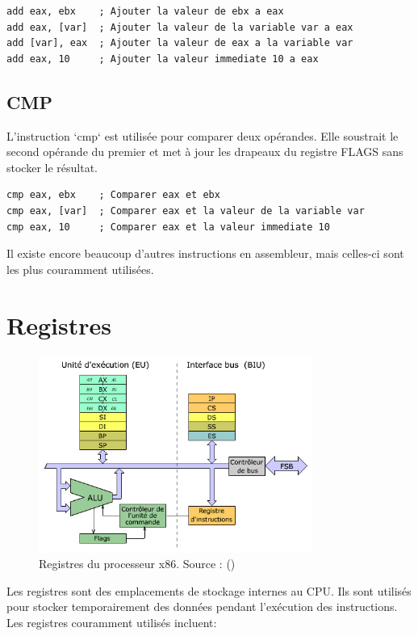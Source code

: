\documentclass[a4paper, 12pt]{report}
\begin{document}
\begin{lstlisting}[language={[x86masm]Assembler}]
add eax, ebx    ; Ajouter la valeur de ebx a eax
add eax, [var]  ; Ajouter la valeur de la variable var a eax
add [var], eax  ; Ajouter la valeur de eax a la variable var
add eax, 10     ; Ajouter la valeur immediate 10 a eax
\end{lstlisting}

\subsection{CMP}
L'instruction `cmp` est utilisée pour comparer deux opérandes. Elle soustrait le second opérande du premier et met à jour les drapeaux du registre FLAGS sans stocker le résultat.

\begin{lstlisting}[language={[x86masm]Assembler}]
cmp eax, ebx    ; Comparer eax et ebx
cmp eax, [var]  ; Comparer eax et la valeur de la variable var
cmp eax, 10     ; Comparer eax et la valeur immediate 10
\end{lstlisting}

Il existe encore beaucoup d'autres instructions en assembleur, mais celles-ci sont les plus couramment utilisées.

\section{Registres}

\begin{figure}[H]
  \centering
  \includegraphics[width=0.8\textwidth]{imgs/registres.jpg}
  \caption{Registres du processeur x86. Source : (\cite{1})}
\end{figure}

Les registres sont des emplacements de stockage internes au CPU. Ils sont utilisés pour stocker temporairement des données pendant l'exécution des instructions. Les registres couramment utilisés incluent:
\end{document}
